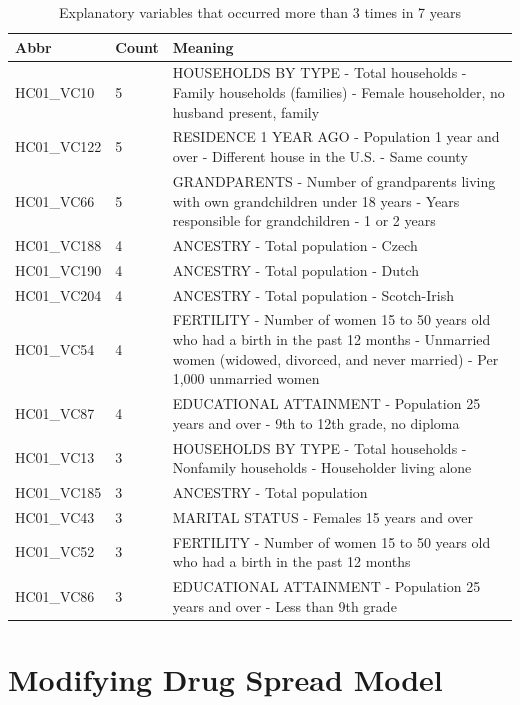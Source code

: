 \documentclass{mcmthesis}
\begin{document}
\begin{table}[htbp]
  \centering
  \small
  \caption{Explanatory variables that occurred more than 3 times in 7 years}
    \begin{tabularx}{\textwidth}{llX}
    \toprule
    Abbr & Count & Meaning \\
    \midrule
    HC01\_VC10 & 5 & HOUSEHOLDS BY TYPE - Total households - Family households (families) - Female householder, no husband present, family \\
    HC01\_VC122 & 5 & RESIDENCE 1 YEAR AGO - Population 1 year and over - Different house in the U.S. - Same county \\
    HC01\_VC66 & 5 & GRANDPARENTS - Number of grandparents living with own grandchildren under 18 years - Years responsible for grandchildren - 1 or 2 years \\
    HC01\_VC188 & 4 & ANCESTRY - Total population - Czech \\
    HC01\_VC190 & 4 & ANCESTRY - Total population - Dutch \\
    HC01\_VC204 & 4 & ANCESTRY - Total population - Scotch-Irish \\
    HC01\_VC54 & 4 & FERTILITY - Number of women 15 to 50 years old who had a birth in the past 12 months - Unmarried women (widowed, divorced, and never married) - Per 1,000 unmarried women \\
    HC01\_VC87 & 4 & EDUCATIONAL ATTAINMENT - Population 25 years and over - 9th to 12th grade, no diploma \\
    HC01\_VC13 & 3 & HOUSEHOLDS BY TYPE - Total households - Nonfamily households - Householder living alone \\
    HC01\_VC185 & 3 & ANCESTRY - Total population \\
    HC01\_VC43 & 3 & MARITAL STATUS - Females 15 years and over \\
    HC01\_VC52 & 3 & FERTILITY - Number of women 15 to 50 years old who had a birth in the past 12 months \\
    HC01\_VC86 & 3 & EDUCATIONAL ATTAINMENT - Population 25 years and over - Less than 9th grade \\
    \bottomrule
    \end{tabularx}%
  \label{tab:addlabel}%
\end{table}%

\section{Modifying Drug Spread Model}
\end{document}
